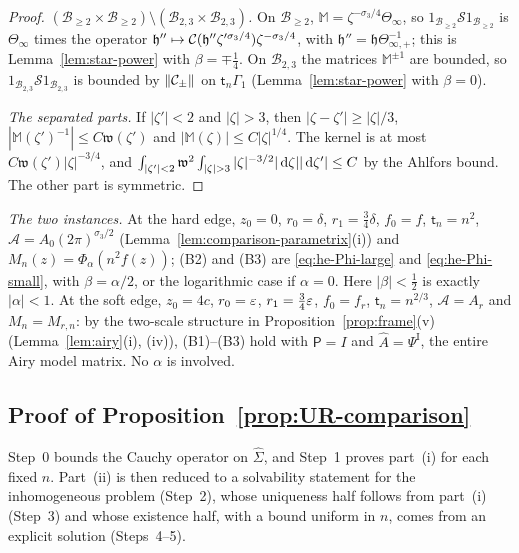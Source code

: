 \begin{proof}
\emph{$(\mathcal B_{\ge2}\times\mathcal B_{\ge2})\setminus(\mathcal B_{2,3}\times\mathcal B_{2,3})$.} On $\mathcal B_{\ge2}$, $\mathbb M=\zeta^{-\sigma_3/4}\Theta_\infty$, so $1_{\mathcal B_{\ge2}}\mathcal S1_{\mathcal B_{\ge2}}$ is
$\Theta_\infty$ times the operator $\mathfrak h''\mapsto\mathcal{C}(\mathfrak h''\zeta'^{\sigma_3/4})\zeta^{-\sigma_3/4}$, with
$\mathfrak h''=\mathfrak h\Theta_{\infty,+}^{-1}$; this is Lemma~\ref{lem:star-power} with $\beta=\mp\frac14$. On $\mathcal B_{2,3}$ the matrices
$\mathbb M^{\pm1}$ are bounded, so $1_{\mathcal B_{2,3}}\mathcal S1_{\mathcal B_{2,3}}$ is bounded by $\|\mathcal{C}_\pm\|$ on $\mathsf t_n\Gamma_1$
(Lemma~\ref{lem:star-power} with $\beta=0$).

\emph{The separated parts.} If $|\zeta'|<2$ and $|\zeta|>3$, then $|\zeta-\zeta'|\ge|\zeta|/3$, $|\mathbb M(\zeta')^{-1}|\le
C\mathfrak w(\zeta')$ and $|\mathbb M(\zeta)|\le C|\zeta|^{1/4}$. The kernel is at most $C\mathfrak w(\zeta')|\zeta|^{-3/4}$, and
$\int_{|\zeta'|<2}\mathfrak w^2\int_{|\zeta|>3}|\zeta|^{-3/2}|\diff\zeta||\diff\zeta'|\le C$ by the Ahlfors bound. The other part is
symmetric.
\end{proof}

\emph{The two instances.} At the hard edge, $z_0=0$, $r_0=\delta$, $r_1=\frac34\delta$, $f_0=f$, $\mathsf t_n=n^2$,
$\mathcal A=A_0(2\pi)^{\sigma_3/2}$ (Lemma~\ref{lem:comparison-parametrix}(i)) and $M_n(z)=\Phi_\alpha(n^2f(z))$; (B2) and (B3) are
\eqref{eq:he-Phi-large} and \eqref{eq:he-Phi-small}, with $\beta=\alpha/2$, or the logarithmic case if $\alpha=0$. Here
$|\beta|<\frac12$ is exactly $|\alpha|<1$. At the soft edge, $z_0=4c$, $r_0=\varepsilon$, $r_1=\frac34\varepsilon$,
$f_0=f_r$, $\mathsf t_n=n^{2/3}$, $\mathcal A=A_r$ and $M_n=M_{r,n}$: by the two-scale structure in Proposition~\ref{prop:frame}(v)
(Lemma~\ref{lem:airy}(i), (iv)), (B1)--(B3) hold with $\mathsf P=I$ and $\hat A=\Psi^{\mathrm I}$, the entire Airy model matrix.
No $\alpha$ is involved.

\subsection{Proof of Proposition~\ref{prop:UR-comparison}}\label{sec:resolvent-proof}

Step~0 bounds the Cauchy operator on $\hat\Sigma$, and Step~1 proves part~(i) for each fixed $n$. Part~(ii) is then
reduced to a solvability statement for the inhomogeneous problem (Step~2), whose uniqueness half follows from part~(i)
(Step~3) and whose existence half, with a bound uniform in $n$, comes from an explicit solution (Steps~4--5).

